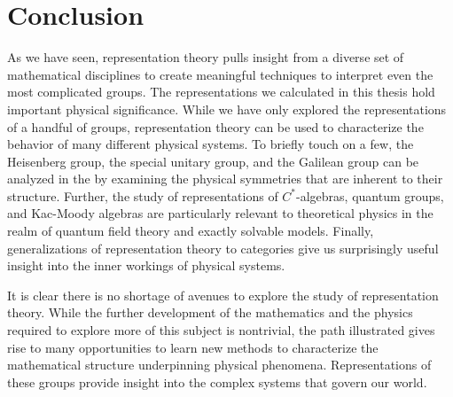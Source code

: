 \chapter{Conclusion}
As we have seen, representation theory pulls insight from a diverse set of mathematical disciplines to create meaningful techniques to interpret even the most complicated groups. The representations we calculated in this thesis hold important physical significance. While we have only explored the representations of a handful of groups, representation theory can be used to characterize the behavior of many different physical systems. To briefly touch on a few, the Heisenberg group, the special unitary group, and the Galilean group can be analyzed in the by examining the physical symmetries that are inherent to their structure. Further, the study of representations of $C^*$-algebras, quantum groups, and Kac-Moody algebras are particularly relevant to theoretical physics in the realm of quantum field theory and exactly solvable models. Finally, generalizations of representation theory to categories give us surprisingly useful insight into the inner workings of physical systems. 

It is clear there is no shortage of avenues to explore the study of representation theory. While the further development of the mathematics and the physics required to explore more of this subject is nontrivial, the path illustrated gives rise to many opportunities to learn new methods to characterize the mathematical structure underpinning physical phenomena. Representations of these groups provide insight into the complex systems that govern our world.
